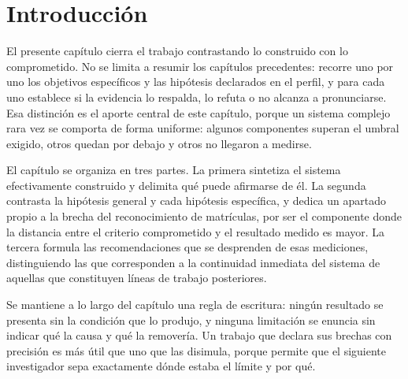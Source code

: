 \section{Introducción}

El presente capítulo cierra el trabajo contrastando lo construido con lo
comprometido. No se limita a resumir los capítulos precedentes: recorre uno por
uno los objetivos específicos y las hipótesis declarados en el perfil, y para
cada uno establece si la evidencia lo respalda, lo refuta o no alcanza a
pronunciarse. Esa distinción es el aporte central de este capítulo, porque un
sistema complejo rara vez se comporta de forma uniforme: algunos componentes
superan el umbral exigido, otros quedan por debajo y otros no llegaron a
medirse.

El capítulo se organiza en tres partes. La primera sintetiza el sistema
efectivamente construido y delimita qué puede afirmarse de él. La segunda
contrasta la hipótesis general y cada hipótesis específica, y dedica un apartado
propio a la brecha del reconocimiento de matrículas, por ser el componente donde
la distancia entre el criterio comprometido y el resultado medido es mayor. La
tercera formula las recomendaciones que se desprenden de esas mediciones,
distinguiendo las que corresponden a la continuidad inmediata del sistema de
aquellas que constituyen líneas de trabajo posteriores.

Se mantiene a lo largo del capítulo una regla de escritura: ningún resultado se
presenta sin la condición que lo produjo, y ninguna limitación se enuncia sin
indicar qué la causa y qué la removería. Un trabajo que declara sus brechas con
precisión es más útil que uno que las disimula, porque permite que el siguiente
investigador sepa exactamente dónde estaba el límite y por qué.
